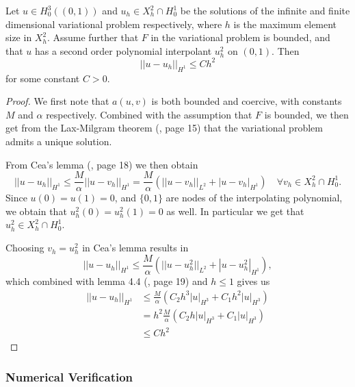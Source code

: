 \begin{theorem}
    Let $u \in H_0^3((0, 1))$ and $u_h \in X_h^2 \cap H_0^1$ be the solutions of the infinite and finite dimensional
    variational problem respectively, where $h$ is the maximum element size in $X_h^2$. Assume further that $F$ in the variational problem is bounded,
    and that $u$ has a second order polynomial interpolant $u_h^2$ on $(0, 1)$. Then
    \begin{equation}
        ||u - u_h||_{H^1} \leq Ch^2
    \end{equation}
    for some constant $C > 0$.
\end{theorem}
\begin{proof}
    We first note that $a(u, v)$ is both bounded and coercive, with constants $M$ and $\alpha$ respectively. Combined with the assumption that $F$ is bounded, we then get from the Lax-Milgram theorem (\cite{CC}, page 15)
    that the variational problem admits a unique solution.
    
    From Cea's lemma (\cite{CC}, page 18) we then obtain
    \begin{equation}
        ||u - u_h||_{H^1} \leq \frac{M}{\alpha}||u - v_h||_{H^1} = \frac{M}{\alpha}(||u - v_h||_{L^2} + |u - v_h|_{H^1}) \quad \forall v_h \in X_h^2 \cap H_0^1.
    \end{equation}
    Since $u(0) = u(1) = 0$, and $\{0, 1\}$ are nodes of the interpolating polynomial, we obtain that $u_h^2(0) = u_h^2(1) = 0$ as well.
    In particular we get that $u_h^2 \in X_h^2 \cap H_0^1$.
    
    Choosing $v_h = u_h^2$ in Cea's lemma results in 
    \begin{equation}
        ||u - u_h||_{H^1} \leq \frac{M}{\alpha}(||u - u_h^2||_{L^2} + |u - u_h^2|_{H^1}),
    \end{equation}
    which combined with lemma 4.4 (\cite{CC}, page 19) and $h \leq 1$ gives us
    \begin{equation}
        \begin{aligned}
            ||u - u_h||_{H^1} &\leq \frac{M}{\alpha}(C_{2}h^3|u|_{H^3} + C_{1}h^2|u|_{H^3}) \\
            &= h^2\frac{M}{\alpha}(C_{2}h|u|_{H^3} + C_{1}|u|_{H^3}) \\
            &\leq Ch^2
        \end{aligned}
    \end{equation}
\end{proof}

\subsubsection{Numerical Verification}

